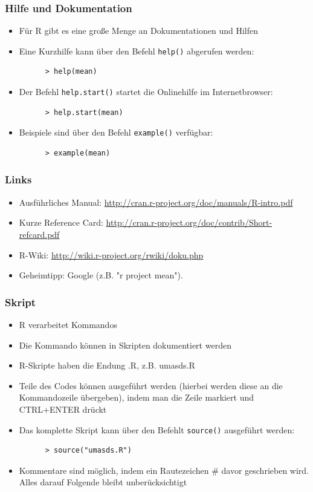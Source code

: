\documentclass{beamer}
\begin{document}
\begin{frame}[fragile]
  \frametitle{Hilfe und Dokumentation}
  \begin{itemize}
    \item Für R gibt es eine große Menge an Dokumentationen und Hilfen
    \item Eine Kurzhilfe kann über den Befehl \Verb+help()+ abgerufen werden:
    \begin{Verbatim}
      > help(mean)
    \end{Verbatim}  
    \item Der Befehl \Verb+help.start()+ startet die Onlinehilfe im Internetbrowser:
    \begin{Verbatim}
      > help.start(mean)
    \end{Verbatim}        
    \item Beispiele sind über den Befehl \Verb+example()+ verfügbar:
    \begin{Verbatim}
      > example(mean)
    \end{Verbatim}
  \end{itemize}
\end{frame}

\begin{frame}
  \frametitle{Links}
  \begin{itemize}
    \item Ausführliches Manual: \url{http://cran.r-project.org/doc/manuals/R-intro.pdf}
    \item Kurze Reference Card: \url{http://cran.r-project.org/doc/contrib/Short-refcard.pdf}
    \item R-Wiki: \url{http://wiki.r-project.org/rwiki/doku.php}
    \item Geheimtipp: Google (z.B. "r project mean").
  \end{itemize}
\end{frame}

\begin{frame}[fragile]
  \frametitle{Skript}
  \begin{itemize}
    \item R verarbeitet Kommandos
    \item Die Kommando können in Skripten dokumentiert werden
    \item R-Skripte haben die Endung .R, z.B. umasds.R
    \item Teile des Codes können ausgeführt werden (hierbei werden diese an die Kommandozeile übergeben), indem  man die Zeile markiert und CTRL+ENTER drückt
    \item Das komplette Skript kann über den Befehlt \Verb+source()+ ausgeführt werden:
    \begin{Verbatim}
      > source("umasds.R")
    \end{Verbatim}
    \item Kommentare sind möglich, indem ein Rautezeichen \# davor geschrieben wird. Alles darauf Folgende bleibt unberücksichtigt
  \end{itemize}
\end{frame}
\end{document}
